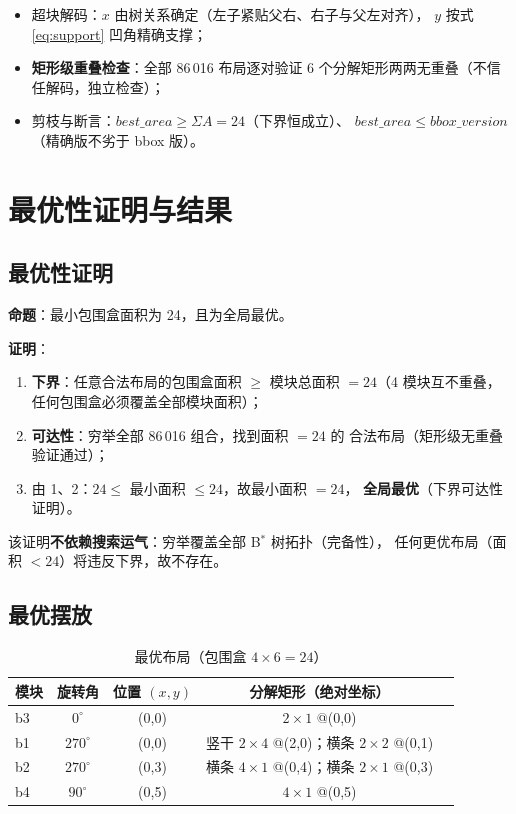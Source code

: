 \documentclass[12pt,a4paper]{article}
\begin{document}
\begin{itemize}
    \item 超块解码：$x$ 由树关系确定（左子紧贴父右、右子与父左对齐），
    $y$ 按式 \eqref{eq:support} 凹角精确支撑；
    \item \textbf{矩形级重叠检查}：全部 86\,016 布局逐对验证
    6 个分解矩形两两无重叠（不信任解码，独立检查）；
    \item 剪枝与断言：$best\_area \ge \Sigma A = 24$（下界恒成立）、
    $best\_area \le bbox\_version$（精确版不劣于 bbox 版）。
\end{itemize}

\section{最优性证明与结果}

\subsection{最优性证明}

\textbf{命题}：最小包围盒面积为 24，且为全局最优。

\textbf{证明}：
\begin{enumerate}
    \item \textbf{下界}：任意合法布局的包围盒面积 $\ge$ 模块总面积
    $= 24$（4 模块互不重叠，任何包围盒必须覆盖全部模块面积）；
    \item \textbf{可达性}：穷举全部 86\,016 组合，找到面积 $= 24$ 的
    合法布局（矩形级无重叠验证通过）；
    \item 由 1、2：$24 \le$ 最小面积 $\le 24$，故最小面积 $= 24$，
    \textbf{全局最优}（下界可达性证明）。
\end{enumerate}

该证明\textbf{不依赖搜索运气}：穷举覆盖全部 B$^*$ 树拓扑（完备性），
任何更优布局（面积 $< 24$）将违反下界，故不存在。

\subsection{最优摆放}

\begin{table}[H]
\centering
\caption{最优布局（包围盒 $4 \times 6 = 24$）}
\small
\begin{tabular}{lcccc}
\toprule
模块 & 旋转角 & 位置 $(x,y)$ & 分解矩形（绝对坐标） \\
\midrule
b3 & $0^\circ$ & (0,0) & $2\times1$ @(0,0) \\
b1 & $270^\circ$ & (0,0) & 竖干 $2\times4$ @(2,0)；横条 $2\times2$ @(0,1) \\
b2 & $270^\circ$ & (0,3) & 横条 $4\times1$ @(0,4)；横条 $2\times1$ @(0,3) \\
b4 & $90^\circ$ & (0,5) & $4\times1$ @(0,5) \\
\bottomrule
\end{tabular}
\end{table}
\end{document}
